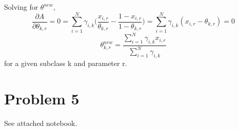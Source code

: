 \documentclass[]{article}
\begin{document}
Solving for $\theta^{new}$,
\[
\frac{\partial A}{\partial \theta_{k,r}} =0= \sum_{i = 1}^{N}\gamma_{i,k}\Big(\frac{x_{i,r}}{\theta_{k,r}}-\frac{1-x_{i,r}}{1-\theta_{k,r}}\Big) = \sum_{i = 1}^{N}\gamma_{i,k}(x_{i,r}-\theta_{k,r})  = 0
\]
\[
\theta^{new}_{k,r} = \frac{\sum_{i=1}^{N}\gamma_{i,k}x_{i,r}}{\sum_{i=1}^{N}\gamma_{i,k}}
\]
for a given subclass k and parameter r.
\section*{Problem 5}
See attached notebook.
\end{document}
